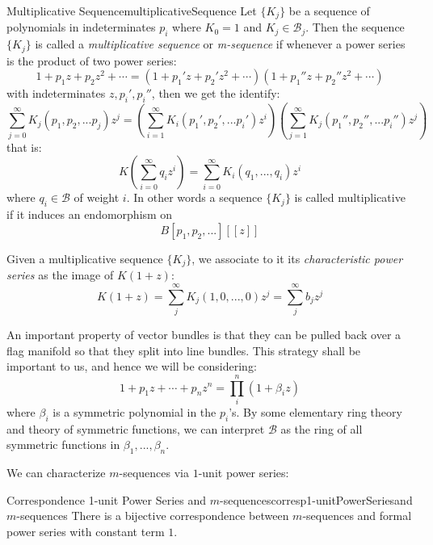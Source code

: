 \documentclass{ut-thesis}
\newcommand{\CB}{{\mathcal{B}}}
\begin{document}
\begin{defn}{Multiplicative Sequence}{multiplicativeSequence}
  Let $\{K_j\}$ be a sequence of polynomials in indeterminates $p_i$ where $K_0 = 1$ and $K_j \in \CB_j$. Then
  the sequence $\{K_j\}$ is called a \emph{multiplicative sequence} or \emph{m-sequence} if whenever a power series is the product
  of two power series:
  \[
    1 + p_1z + p_2z^2  +\cdots = (1 + p_1'z + p_2'z^2  +\cdots)(1 + p_1''z + p_2''z^2  +\cdots)
  \]
  with indeterminates $z, p_i', p_i''$, then we get the identify:
  \[
    \sum_{j=0}^\infty K_j(p_1, p_2, ... p_j)z^j = \left(\sum_{i=1}^\infty K_i(p_1', p_2', ...
    p_i')z^i\right)\left(\sum_{j=1}^\infty K_j(p_1'', p_2'', ... p_i'')z^j\right)
  \]
  that is:
  \[
    K \left(\sum_{i=0}^\infty q_iz^i\right) = \sum_{i=0}^\infty K_i(q_1, ..., q_i)z^i
  \]
  where $q_i \in \CB$ of weight $i$. In other words a sequence $\{K_j\}$ is called multiplicative if it induces an endomorphism on
  \[
    B[p_1, p_2, ...]\left[[z]\right]
  \]
\end{defn}

Given a multiplicative sequence $\{K_j\}$, we associate to it its \emph{characteristic power series} as the
image of $K(1+z)$:
\[
  K(1+z) = \sum_j^\infty K_j(1, 0, ..., 0)z^j = \sum_j^\infty b_jz^j
\]

An important property of vector bundles is that they can be pulled back over a flag manifold so that they
split into line bundles. This strategy shall be important to us, and hence we will be considering:
\[
  1 + p_1z + \cdots + p_nz^n = \prod_i^n \left(1 + \beta_iz\right)
\]
where $\beta_i$ is a symmetric polynomial in the $p_i$'s. By some elementary ring theory and theory of
symmetric functions, we can interpret $\CB$ as the ring of all symmetric functions in $\beta_1, ..., \beta_n$.


We can characterize $m$-sequences via $1$-unit power series:

\begin{prop}{Correspondence 1-unit Power Series and $m$-sequences}{corresp1-unitPowerSeriesand$m$-sequences}
  There is a bijective correspondence between $m$-sequences and formal power series with constant term $1$.
\end{prop}
\end{document}
